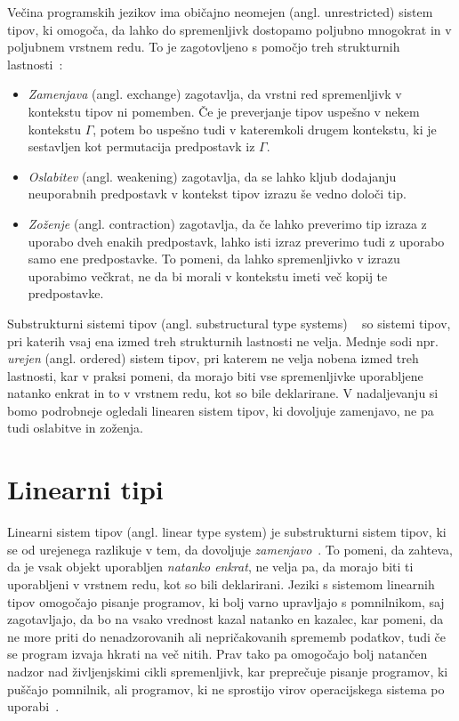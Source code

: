 Večina programskih jezikov ima običajno neomejen (angl. unrestricted) sistem tipov, ki omogoča, da lahko do spremenljivk dostopamo poljubno mnogokrat in v poljubnem vrstnem redu. To je zagotovljeno s pomočjo treh strukturnih lastnosti~\cite{pierce2004advanced}:
\begin{itemize}
    \itemsep 0em
    \item \textit{Zamenjava} (angl. exchange) zagotavlja, da vrstni red spremenljivk v kontekstu tipov ni pomemben. Če je preverjanje tipov uspešno v nekem kontekstu $\Gamma$, potem bo uspešno tudi v kateremkoli drugem kontekstu, ki je sestavljen kot permutacija predpostavk iz $\Gamma$.
    \item \textit{Oslabitev} (angl. weakening) zagotavlja, da se lahko kljub dodajanju neuporabnih predpostavk v kontekst tipov izrazu še vedno določi tip.
    \item \textit{Zoženje} (angl. contraction) zagotavlja, da če lahko preverimo tip izraza z uporabo dveh enakih predpostavk, lahko isti izraz preverimo tudi z uporabo samo ene predpostavke. To pomeni, da lahko spremenljivko v izrazu uporabimo večkrat, ne da bi morali v kontekstu imeti več kopij te predpostavke.
\end{itemize}

Substrukturni sistemi tipov (angl. substructural type systems) ~\cite{pierce2004advanced} so sistemi tipov, pri katerih vsaj ena izmed treh strukturnih lastnosti ne velja. Mednje sodi npr. \textit{urejen} (angl. ordered) sistem tipov, pri katerem ne velja nobena izmed treh lastnosti, kar v praksi pomeni, da morajo biti vse spremenljivke uporabljene natanko enkrat in to v vrstnem redu, kot so bile deklarirane. V nadaljevanju si bomo podrobneje ogledali linearen sistem tipov, ki dovoljuje zamenjavo, ne pa tudi oslabitve in zoženja.

\section{Linearni tipi}
\label{sec:linearni-tipi}

Linearni sistem tipov (angl. linear type system) je substrukturni sistem tipov, ki se od urejenega razlikuje v tem, da dovoljuje \textit{zamenjavo}~\cite{pierce2004advanced}. To pomeni, da zahteva, da je vsak objekt uporabljen \textit{natanko enkrat}, ne velja pa, da morajo biti ti uporabljeni v vrstnem redu, kot so bili deklarirani. Jeziki s sistemom linearnih tipov omogočajo pisanje programov, ki bolj varno upravljajo s pomnilnikom, saj zagotavljajo, da bo na vsako vrednost kazal natanko en kazalec, kar pomeni, da ne more priti do nenadzorovanih ali nepričakovanih sprememb podatkov, tudi če se program izvaja hkrati na več nitih. Prav tako pa omogočajo bolj natančen nadzor nad življenjskimi cikli spremenljivk, kar preprečuje pisanje programov, ki puščajo pomnilnik, ali programov, ki ne sprostijo virov operacijskega sistema po uporabi~\cite{pierce2004advanced}.

